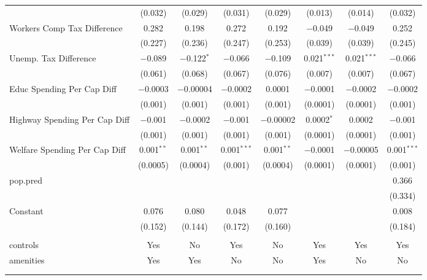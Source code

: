 \begin{table}[!htbp]
\begin{tabular}{@{\extracolsep{5pt}}lccccccc}
  & (0.032) & (0.029) & (0.031) & (0.029) & (0.013) & (0.014) & (0.032) \\ 
  Workers Comp Tax Difference & 0.282 & 0.198 & 0.272 & 0.192 & $-$0.049 & $-$0.049 & 0.252 \\ 
  & (0.227) & (0.236) & (0.247) & (0.253) & (0.039) & (0.039) & (0.245) \\ 
  Unemp. Tax Difference & $-$0.089 & $-$0.122$^{*}$ & $-$0.066 & $-$0.109 & 0.021$^{***}$ & 0.021$^{***}$ & $-$0.066 \\ 
  & (0.061) & (0.068) & (0.067) & (0.076) & (0.007) & (0.007) & (0.067) \\ 
  Educ Spending Per Cap Diff & $-$0.0003 & $-$0.00004 & $-$0.0002 & 0.0001 & $-$0.0001 & $-$0.0002 & $-$0.0002 \\ 
  & (0.001) & (0.001) & (0.001) & (0.001) & (0.0001) & (0.0001) & (0.001) \\ 
  Highway Spending Per Cap Diff & $-$0.001 & $-$0.0002 & $-$0.001 & $-$0.00002 & 0.0002$^{*}$ & 0.0002 & $-$0.001 \\ 
  & (0.001) & (0.001) & (0.001) & (0.001) & (0.0001) & (0.0001) & (0.001) \\ 
  Welfare Spending Per Cap Diff & 0.001$^{**}$ & 0.001$^{**}$ & 0.001$^{***}$ & 0.001$^{**}$ & $-$0.0001 & $-$0.00005 & 0.001$^{***}$ \\ 
  & (0.0005) & (0.0004) & (0.001) & (0.0004) & (0.0001) & (0.0001) & (0.001) \\ 
  pop.pred &  &  &  &  &  &  & 0.366 \\ 
  &  &  &  &  &  &  & (0.334) \\ 
  Constant & 0.076 & 0.080 & 0.048 & 0.077 &  &  & 0.008 \\ 
  & (0.152) & (0.144) & (0.172) & (0.160) &  &  & (0.184) \\ 
 \hline \\[-1.8ex] 
controls & Yes & No & Yes & No & Yes & Yes & Yes \\ 
amenities & Yes & Yes & No & No & Yes & No & No \\ 
\hline \\[-1.8ex] 
\hline 
\hline \\[-1.8ex] 
\end{tabular} 
\end{table} 
